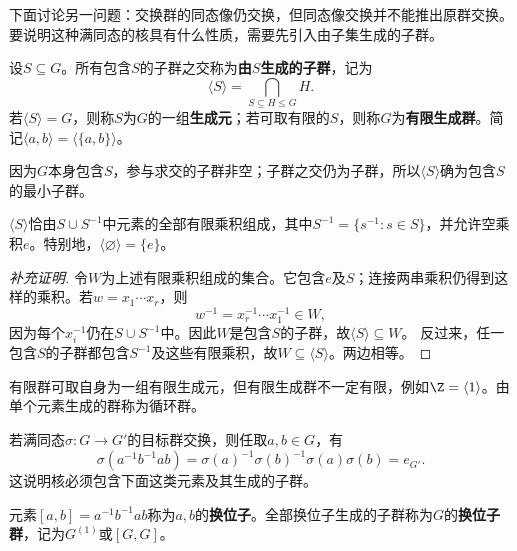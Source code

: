 下面讨论另一问题：交换群的同态像仍交换，但同态像交换并不能推出原群交换。要说明这种满同态的核具有什么性质，需要先引入由子集生成的子群。

\begin{definition}
设$S\subseteq G$。所有包含$S$的子群之交称为\textbf{由$S$生成的子群}，记为
\[
\langle S\rangle=\bigcap_{S\subseteq H\leq G}H.
\]
若$\langle S\rangle=G$，则称$S$为$G$的一组\textbf{生成元}；若可取有限的$S$，则称$G$为\textbf{有限生成群}。简记$\langle a,b\rangle=\langle\{a,b\}\rangle$。
\end{definition}

因为$G$本身包含$S$，参与求交的子群非空；子群之交仍为子群，所以$\langle S\rangle$确为包含$S$的最小子群。

\begin{proposition}
$\langle S\rangle$恰由$S\cup S^{-1}$中元素的全部有限乘积组成，其中$S^{-1}=\{s^{-1}:s\in S\}$，并允许空乘积$e$。特别地，$\langle\varnothing\rangle=\{e\}$。
\end{proposition}
\begin{proof}[补充证明]
令$W$为上述有限乘积组成的集合。它包含$e$及$S$；连接两串乘积仍得到这样的乘积。若$w=x_1\cdots x_r$，则
\[
w^{-1}=x_r^{-1}\cdots x_1^{-1}\in W,
\]
因为每个$x_i^{-1}$仍在$S\cup S^{-1}$中。因此$W$是包含$S$的子群，故$\langle S\rangle\subseteq W$。
反过来，任一包含$S$的子群都包含$S^{-1}$及这些有限乘积，故$W\subseteq\langle S\rangle$。两边相等。
\end{proof}

有限群可取自身为一组有限生成元，但有限生成群不一定有限，例如$\Z=\langle1\rangle$。由单个元素生成的群称为循环群。

若满同态$\sigma:G\to G'$的目标群交换，则任取$a,b\in G$，有
\[
\sigma(a^{-1}b^{-1}ab)
=\sigma(a)^{-1}\sigma(b)^{-1}\sigma(a)\sigma(b)=e_{G'}.
\]
这说明核必须包含下面这类元素及其生成的子群。

\begin{definition}
元素$[a,b]=a^{-1}b^{-1}ab$称为$a,b$的\textbf{换位子}。全部换位子生成的子群称为$G$的\textbf{换位子群}，记为$G^{(1)}$或$[G,G]$。
\end{definition}

